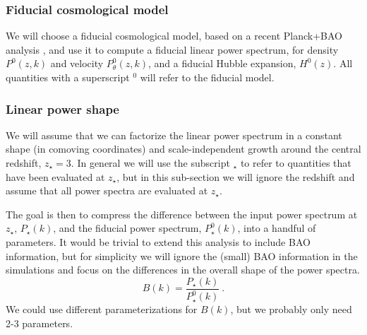 

\subsubsection{Fiducial cosmological model}
 
We will choose a fiducial cosmological model, based on a recent Planck+BAO
analysis \cite{Planck2015}, and use it to compute a fiducial linear power
spectrum, for density $P^0(z,k)$ and velocity $P_\theta^0(z,k)$, and a
fiducial Hubble expansion, $H^0(z)$.
All quantities with a superscript $^0$ will refer to the fiducial model.

\subsubsection{Linear power shape}

We will assume that we can factorize the linear power spectrum in a 
constant shape (in comoving coordinates) and scale-independent growth 
around the central redshift, $z_\star=3$. 
In general we will use the subscript $_\star$ to refer to quantities that 
have been evaluated at $z_\star$, but in this sub-section we will ignore 
the redshift and assume that all power spectra are evaluated at $z_\star$.

The goal is then to compress the difference between the input power spectrum
at $z_\star$, $P_\star(k)$, and the fiducial power spectrum, $P_\star^0(k)$, 
into a handful of parameters.
It would be trivial to extend this analysis to include BAO information, but
for simplicity we will ignore the (small) BAO information in the simulations
and focus on the differences in the overall shape of the power spectra.
\begin{equation}
 B(k) = \frac{P_\star(k)}{P_\star^0(k)} ~. 
\end{equation}
We could use different parameterizations for $B(k)$, but we probably only
need 2-3 parameters.

